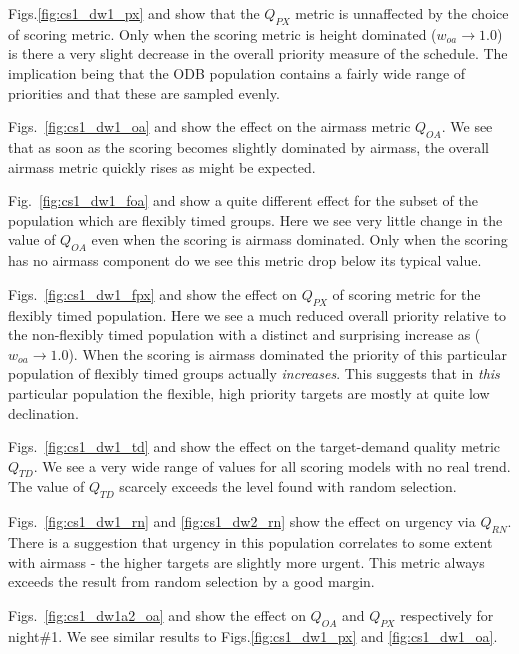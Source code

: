 Figs.\ref{fig:cs1_dw1_px} and  show that the $Q_{PX}$ metric is unnaffected by the choice of scoring metric. Only when the scoring metric is height dominated ($w_{oa} \rightarrow 1.0$) is there a very slight decrease in the overall priority measure of the schedule. The implication being that the ODB population contains a fairly wide range of priorities and that these are sampled evenly.

Figs.~\ref{fig:cs1_dw1_oa} and  show the effect on the airmass metric $Q_{OA}$. We see that as soon as the scoring becomes slightly dominated by airmass, the overall airmass metric quickly rises as might be expected.

Fig.~\ref{fig:cs1_dw1_foa} and  show a quite different effect for the subset of the population which are flexibly timed groups. Here we see very little change in the value of $Q_{OA}$ even when the scoring is airmass dominated. Only when the scoring has no airmass component do we see this metric drop below its typical value.

Figs.~\ref{fig:cs1_dw1_fpx} and  show the effect on $Q_{PX}$ of scoring metric for the flexibly timed population. Here we see a much reduced overall priority relative to the non-flexibly timed population with a distinct and surprising increase as ($w_{oa} \rightarrow 1.0$). When the scoring is airmass dominated the priority of this particular population of flexibly timed groups actually \emph{increases}. This suggests that in \emph{this} particular population the flexible, high priority targets are mostly at quite low declination.

Figs.~\ref{fig:cs1_dw1_td} and  show the effect on the target-demand quality metric $Q_{TD}$. We see a very wide range of values for all scoring models with no real trend. The value of $Q_{TD}$ scarcely exceeds the level found with random selection. 

Figs.~\ref{fig:cs1_dw1_rn} and \ref{fig:cs1_dw2_rn} show the effect on urgency via $Q_{RN}$. There is a suggestion that urgency in this population correlates to some extent with airmass - the higher targets are slightly more urgent. This metric always exceeds the result from random selection by a good margin.

Figs.~\ref{fig:cs1_dw1a2_oa} and  show the effect on $Q_{OA}$ and $Q_{PX}$ respectively for night\#1. We see similar results to Figs.\ref{fig:cs1_dw1_px} and \ref{fig:cs1_dw1_oa}.

